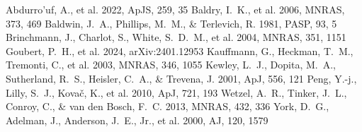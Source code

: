 \documentclass[twocolumn]{aastex631}
\begin{document}
\begin{thebibliography}{}
 Abdurro'uf, A., et al. 2022, ApJS, 259, 35
 Baldry, I.~K., et al. 2006, MNRAS, 373, 469
 Baldwin, J.~A., Phillips, M.~M., \& Terlevich, R. 1981, PASP, 93, 5
 Brinchmann, J., Charlot, S., White, S.~D.~M., et al. 2004, MNRAS, 351, 1151
 Goubert, P.~H., et al. 2024, arXiv:2401.12953
 Kauffmann, G., Heckman, T.~M., Tremonti, C., et al. 2003, MNRAS, 346, 1055
 Kewley, L.~J., Dopita, M.~A., Sutherland, R.~S., Heisler, C.~A., \& Trevena, J. 2001, ApJ, 556, 121
 Peng, Y.-j., Lilly, S.~J., Kova\v{c}, K., et al. 2010, ApJ, 721, 193
 Wetzel, A.~R., Tinker, J.~L., Conroy, C., \& van den Bosch, F.~C. 2013, MNRAS, 432, 336
 York, D.~G., Adelman, J., Anderson, J.~E., Jr., et al. 2000, AJ, 120, 1579
\end{thebibliography}
\end{document}
